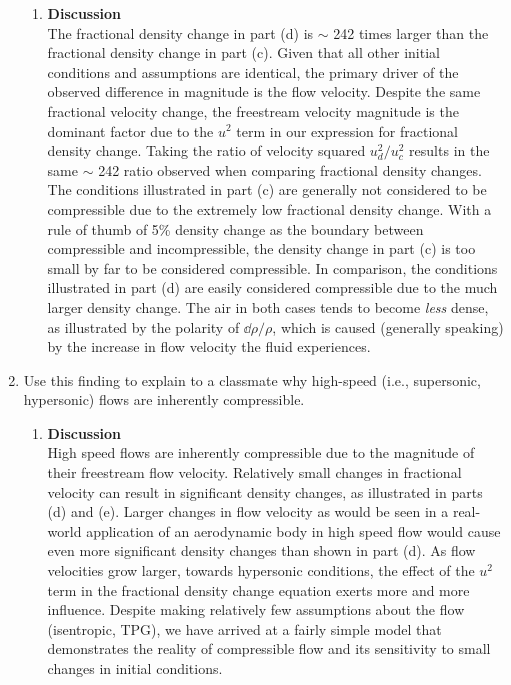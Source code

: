 \documentclass[12pt,letterpaper]{article}
\begin{document}
\begin{enumerate}[label=(\alph*)]
		\begin{enumerate}[label=\arabic*.]
			
			\item{\textbf{Discussion}} \\
			The fractional density change in part (d) is $\sim$ 242 times larger than the fractional density change in part (c). Given that all other initial conditions and assumptions are identical, the primary driver of the observed difference in magnitude is the flow velocity. Despite the same fractional velocity change, the freestream velocity magnitude is the dominant factor due to the $u^2$ term in our expression for fractional density change. Taking the ratio of velocity squared $u_{d}^2/u_{c}^2$ results in the same $\sim$ 242 ratio observed when comparing fractional density changes. \\The conditions illustrated in part (c) are generally not considered to be compressible due to the extremely low fractional density change. With a rule of thumb of 5\% density change as the boundary between compressible and incompressible, the density change in part (c) is too small by far to be considered compressible. In comparison, the conditions illustrated in part (d) are easily considered compressible due to the much larger density change. The air in both cases tends to become \textit{less} dense, as illustrated by the polarity of $\dd \rho/\rho$, which is caused (generally speaking) by the increase in flow velocity the fluid experiences. 
		\end{enumerate}
	
		\item Use this finding to explain to a classmate why high-speed (i.e., supersonic, hypersonic) flows are inherently compressible.
		
		\begin{enumerate}[label=\arabic*.]

			\item{\textbf{Discussion}} \\
			High speed flows are inherently compressible due to the magnitude of their freestream flow velocity. Relatively small changes in fractional velocity can result in significant density changes, as illustrated in parts (d) and (e). Larger changes in flow velocity as would be seen in a real-world application of an aerodynamic body in high speed flow would cause even more significant density changes than shown in part (d). As flow velocities grow larger, towards hypersonic conditions, the effect of the $u^2$ term in the fractional density change equation exerts more and more influence. Despite making relatively few assumptions about the flow (isentropic, TPG), we have arrived at a fairly simple model that demonstrates the reality of compressible flow and its sensitivity to small changes in initial conditions.

		\end{enumerate}
		
		
	\end{enumerate}
\end{document}
